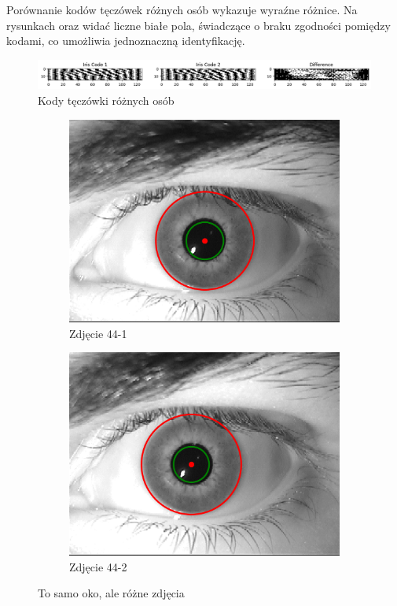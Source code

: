 \documentclass[a4paper]{article}
\begin{document}
Porównanie kodów tęczówek różnych osób wykazuje wyraźne różnice. Na rysunkach  oraz  widać liczne białe pola, świadczące o braku zgodności pomiędzy kodami, co umożliwia jednoznaczną identyfikację.

\begin{figure}[H]
    \centering
    \includegraphics[width=0.75\linewidth]{figures/rozne osoby.png}
    \caption{Kody tęczówki różnych osób}
    \label{fig:rozne-osoby}
\end{figure}

\begin{figure}[H]
    \centering
    \begin{subfigure}[t]{0.48\linewidth}
        \centering
        \includegraphics[width=0.75\linewidth]{figures/44-1.png}
        \caption{Zdjęcie 44-1}
    \end{subfigure}
    \begin{subfigure}[t]{0.48\linewidth}
        \centering
        \includegraphics[width=0.75\linewidth]{figures/44-2.png}
        \caption{Zdjęcie 44-2}
    \end{subfigure}
    \caption{To samo oko, ale różne zdjęcia}
    \label{fig:to-samo-oko-comparison}
\end{figure}
\end{document}
